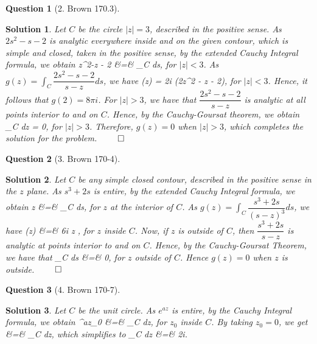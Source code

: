 \documentclass{article} %
\def\eQb#1\eQe{\begin{eqnarray*}#1\end{eqnarray*}}
\theoremstyle{quest}
\newtheorem*{question}{Question}
\newtheorem*{solution}{Solution}
\begin{document}
\bigskip

\begin{question}[2. Brown 170.3]
\end{question}
\begin{solution}
Let $C$ be the circle $|z| = 3$, described in the positive sense.
As $2s^2 - s - 2$ is analytic everywhere inside and on the given contour,
which is simple and closed, taken in the positive sense, by the 
extended Cauchy Integral formula, we obtain 
\eQb
2z^2-z - 2 &=&  \int_{C}  ds,
\eQe 
for $|z| < 3$. As $g(z) = \int_{C} \dfrac{2s^2 - s - 2}{s-z} ds$, we have
\eQb
g(z) = 2\pi i (2z^2 - z - 2),
\eQe 
for $|z| < 3$. Hence, it follows that $g(2) = 8\pi i$. For $|z| > 3$,
we have that $\dfrac{2s^2 - s -2 }{s - z}$ is analytic at all points 
interior to and on $C$. Hence, by the Cauchy-Goursat theorem, we obtain
\eQb
\int_{C}  dz = 0,
\eQe 
for $|z| > 3$. Therefore, $g(z) = 0$ when $|z| > 3$,
which completes the solution for the problem. $\qed$
\end{solution}

\bigskip

\begin{question}[3. Brown 170-4]
\end{question}
\begin{solution}
Let $C$ be any simple closed contour, described in the positive sense
in the $z$ plane. As $s^3 + 2s$ is entire, by the extended Cauchy Integral
formula, we obtain
\eQb
6z &=&  \int_{C}  ds,
\eQe
for $z$ at the interior of $C$. 
As $g(z) = \int_{C} \dfrac{s^3 +2s}{(s-z)^3} ds$, we have 
\eQb
g(z) &=& 6\pi i z ,
\eQe
for $z$ inside $C$. 
Now, if $z$ is outside of $C$, then $\dfrac{s^3 + 2s}
{s-z}$ is analytic at points interior to and on $C$. Hence, by
the Cauchy-Goursat Theorem, we have that
\eQb
\int_{C}  ds &=& 0,
\eQe
for $z$ outside of $C$. 
Hence $g(z) = 0$ when $z$ is outside. $\qed$
\end{solution}

\bigskip
\begin{question}[4. Brown 170-7]
\end{question}
\begin{solution}
Let $C$ be the unit circle. As $e^{az}$ is entire, by the Cauchy Integral
formula, we obtain
\eQb
e^{az_0} &=&  \int_{C}  dz, 
\eQe
for $z_0$ inside $C$. By taking $z_0 = 0$, we get
\eQb
1 &=&  \int_{C}  dz,
\eQe
which simplifies to 
\eQb
\int_{C}  dz &=& 2\pi i. 
\eQe
\end{solution}
\end{document}
